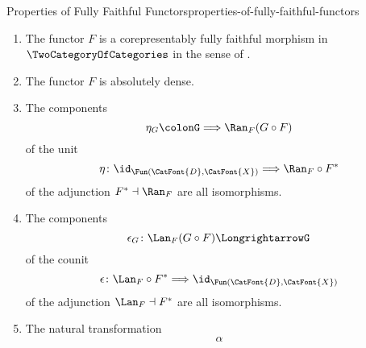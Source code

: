 \begin{proposition}{Properties of Fully Faithful Functors}{properties-of-fully-faithful-functors}
\begin{enumerate}
\begin{enumerate}
                    \[
                        \Lan_{F}%
                        \colon
                        \Fun(\CatFont{C},\Sets)
                        \to
                        \Fun(\CatFont{D},\Sets)
                    \]%
                    is fully faithful.
                \item\label{properties-of-fully-faithful-functors-interaction-with-precomposition-4-d}The functor $F$ is a corepresentably fully faithful morphism in $\TwoCategoryOfCategories$ in the sense of .
                \item\label{properties-of-fully-faithful-functors-interaction-with-precomposition-4-e}The functor $F$ is absolutely dense.
                \item\label{properties-of-fully-faithful-functors-interaction-with-precomposition-4-f}The components
                    \[
                        \eta_{G}%
                        \colon%
                        G%
                        \Longrightarrow%
                        \Ran_{F}(G\circ F)%
                    \]%
                    of the unit
                    \[
                        \eta%
                        \colon%
                        \id_{\Fun(\CatFont{D},\CatFont{X})}%
                        \Longrightarrow%
                        \Ran_{F}\circ F^{*}%
                    \]%
                    of the adjunction $F^{*}\dashv\Ran_{F}$ are all isomorphisms.
                \item\label{properties-of-fully-faithful-functors-interaction-with-precomposition-4-g}The components
                    \[
                        \epsilon_{G}%
                        \colon%
                        \Lan_{F}(G\circ F)%
                        \Longrightarrow%
                        G%
                    \]%
                    of the counit
                    \[
                        \epsilon%
                        \colon%
                        \Lan_{F}\circ F^{*}%
                        \Longrightarrow%
                        \id_{\Fun(\CatFont{D},\CatFont{X})}%
                    \]%
                    of the adjunction $\Lan_{F}\dashv F^{*}$ are all isomorphisms.
                \item\label{properties-of-fully-faithful-functors-interaction-with-precomposition-4-h}The natural transformation
                    \[
                        \alpha%
\]
\end{enumerate}
\end{enumerate}
\end{proposition}
